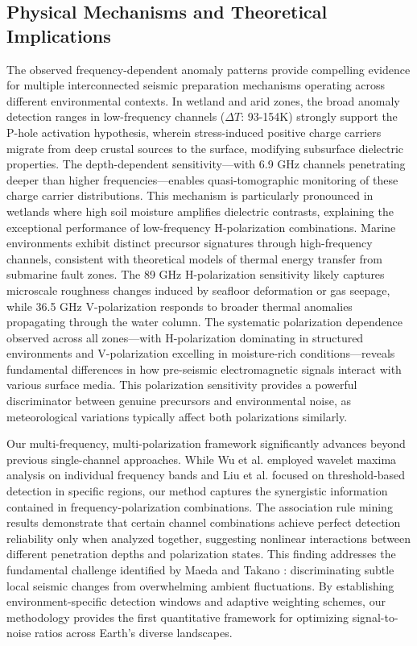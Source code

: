 \documentclass[fleqn,10pt]{wlscirep_mdpi_style}
\begin{document}
\subsection{Physical Mechanisms and Theoretical Implications}
The observed frequency-dependent anomaly patterns provide compelling evidence for multiple interconnected seismic preparation mechanisms operating across different environmental contexts. In wetland and arid zones, the broad anomaly detection ranges in low-frequency channels ($\Delta T$: 93-154K) strongly support the P-hole activation hypothesis, wherein stress-induced positive charge carriers migrate from deep crustal sources to the surface, modifying subsurface dielectric properties. The depth-dependent sensitivity—with 6.9 GHz channels penetrating deeper than higher frequencies—enables quasi-tomographic monitoring of these charge carrier distributions. This mechanism is particularly pronounced in wetlands where high soil moisture amplifies dielectric contrasts, explaining the exceptional performance of low-frequency H-polarization combinations.
Marine environments exhibit distinct precursor signatures through high-frequency channels, consistent with theoretical models of thermal energy transfer from submarine fault zones. The 89 GHz H-polarization sensitivity likely captures microscale roughness changes induced by seafloor deformation or gas seepage, while 36.5 GHz V-polarization responds to broader thermal anomalies propagating through the water column. The systematic polarization dependence observed across all zones—with H-polarization dominating in structured environments and V-polarization excelling in moisture-rich conditions—reveals fundamental differences in how pre-seismic electromagnetic signals interact with various surface media. This polarization sensitivity provides a powerful discriminator between genuine precursors and environmental noise, as meteorological variations typically affect both polarizations similarly.

Our multi-frequency, multi-polarization framework significantly advances beyond previous single-channel approaches. While Wu et al. \cite{wuIdentifyingSeismicAnomalies2024} employed wavelet maxima analysis on individual frequency bands and Liu et al. \cite{liuPreearthquakeMBTAnomalies2023} focused on threshold-based detection in specific regions, our method captures the synergistic information contained in frequency-polarization combinations. The association rule mining results demonstrate that certain channel combinations achieve perfect detection reliability only when analyzed together, suggesting nonlinear interactions between different penetration depths and polarization states. This finding addresses the fundamental challenge identified by Maeda and Takano \cite{maedaDiscriminationLocalFaint2008}: discriminating subtle local seismic changes from overwhelming ambient fluctuations. By establishing environment-specific detection windows and adaptive weighting schemes, our methodology provides the first quantitative framework for optimizing signal-to-noise ratios across Earth's diverse landscapes.
\end{document}
